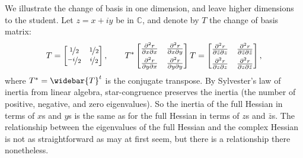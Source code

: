 \documentclass[12pt,openany]{book}
\newcommand{\C}{{\mathbb{C}}}
\theoremstyle{plain}
\theoremstyle{remark}
\theoremstyle{definition}
\theoremstyle{exercise}
\theoremstyle{example}
\begin{document}
We illustrate the change of basis in one dimension, and leave higher
dimensions to the student.  Let $z =
x+iy$ be in $\C$, and denote by $T$ the change of basis matrix:
\begin{equation*}
T =
\begin{bmatrix}
\nicefrac{1}{2} & \nicefrac{1}{2} \\
\nicefrac{-i}{2} & \nicefrac{i}{2}
\end{bmatrix}
,
\qquad
T^*
\begin{bmatrix}
\frac{\partial^2 r}{\partial x \partial x} &
\frac{\partial^2 r}{\partial x \partial y}
\\[4pt]
\frac{\partial^2 r}{\partial y \partial x} &
\frac{\partial^2 r}{\partial y \partial y}
\end{bmatrix}
T
=
\begin{bmatrix}
\frac{\partial^2 r}{\partial \bar{z} \partial z} &
\frac{\partial^2 r}{\partial \bar{z} \partial \bar{z}}
\\[4pt]
\frac{\partial^2 r}{\partial z \partial z} &
\frac{\partial^2 r}{\partial z \partial \bar{z}}
\end{bmatrix}
,
\end{equation*}
where
%
$T^* = \widebar{T}^t$ is the conjugate transpose.
By Sylvester's law of inertia from linear algebra, star-congruence
preserves the inertia (the number of positive, negative, and zero
eigenvalues).  So the
inertia of the full Hessian in terms of $x$s and $y$s is the same
as for the full Hessian in terms of $z$s and $\bar{z}$s.
The relationship between the eigenvalues of the full Hessian and the complex
Hessian is not as straightforward as may at first seem, but there is
a relationship there nonetheless.
\end{document}

